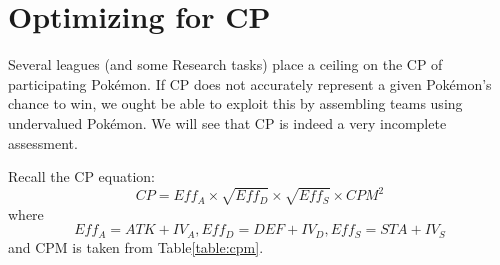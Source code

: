 \chapter{Optimizing for CP}

Several leagues (and some Research tasks) place a ceiling on the CP of
 participating Pokémon.
If CP does not accurately represent a given Pokémon's chance to win, we ought
 be able to exploit this by assembling teams using undervalued Pokémon.
We will see that CP is indeed a very incomplete assessment.

Recall the CP equation:
\[ CP = Eff_A \times \sqrt{Eff_D} \times \sqrt{Eff_S} \times CPM^2 \]
where
\[ Eff_A = ATK + IV_A, Eff_D = DEF + IV_D, Eff_S = STA + IV_S \]
and CPM is taken from Table\ref{table:cpm}.
